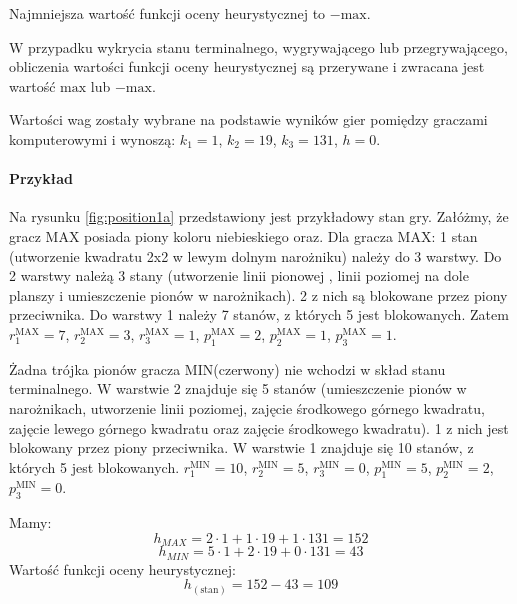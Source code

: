 \documentclass{scrartcl}
\begin{document}
Najmniejsza wartość funkcji oceny heurystycznej to $-\text{max}$.

W przypadku wykrycia stanu terminalnego, wygrywającego lub
przegrywającego, obliczenia wartości funkcji oceny heurystycznej są
przerywane i zwracana jest wartość $\text{max}$ lub $-\text{max}$.

Wartości wag zostały wybrane na podstawie wyników gier pomiędzy 
graczami komputerowymi i wynoszą: $k_1 = 1$, $k_2 = 19$, $k_3 = 131$, $h = 0$.

\paragraph{Przykład}
Na rysunku \ref{fig:position1a} przedstawiony jest przykładowy stan
gry. Załóżmy, że gracz MAX posiada piony koloru niebieskiego oraz. Dla
gracza MAX: 1 stan (utworzenie kwadratu 2x2 w lewym dolnym narożniku)
należy do 3 warstwy. Do 2 warstwy należą 3 stany (utworzenie linii
pionowej , linii poziomej na dole planszy i umieszczenie pionów w
narożnikach). 2 z nich są blokowane przez piony przeciwnika. 
Do warstwy 1 należy 7 stanów, z których 5 jest blokowanych. Zatem $r_1^{\text{MAX}} = 7$,
$r_2^{\text{MAX}} = 3$, $r_3^{\text{MAX}} = 1$, $p_1^{\text{MAX}} = 2$,
$p_2^{\text{MAX}} = 1$, $p_3^{\text{MAX}} = 1$. 

Żadna trójka pionów gracza MIN(czerwony) nie wchodzi w skład stanu
terminalnego. W warstwie 2 znajduje się 5 stanów (umieszczenie pionów
w narożnikach, utworzenie linii poziomej, zajęcie środkowego górnego
kwadratu, zajęcie lewego górnego
kwadratu oraz zajęcie środkowego kwadratu). 1 z nich jest blokowany przez piony przeciwnika. W warstwie
1 znajduje się 10 stanów, z których 5 jest blokowanych.
$r_1^{\text{MIN}} = 10$,
$r_2^{\text{MIN}} = 5$, $r_3^{\text{MIN}} = 0$, $p_1^{\text{MIN}} = 5$,
$p_2^{\text{MIN}} = 2$, $p_3^{\text{MIN}} = 0$. 

Mamy:
\[ h_{MAX} = 2 \cdot 1 + 1 \cdot 19 + 1 \cdot 131 = 152 \]
\[ h_{MIN} = 5 \cdot 1 + 2 \cdot 19 + 0 \cdot 131 = 43 \]
Wartość funkcji oceny heurystycznej:
\[ h_(\text{stan}) = 152 - 43 = 109 \]
\end{document}
